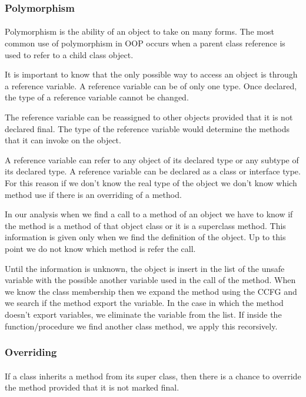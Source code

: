 \documentclass[letterpaper,twocolumn,10pt]{article}
\begin{document}
\subsubsection{Polymorphism} \paragraph{}
Polymorphism is the ability of an object to take on many forms. The most common use of polymorphism in OOP occurs when a parent class reference is used to refer to a child class object.

It is important to know that the only possible way to access an object is through a reference variable. A reference variable can be of only one type. Once declared, the type of a reference variable cannot be changed.

The reference variable can be reassigned to other objects provided that it is not declared final. The type of the reference variable would determine the methods that it can invoke on the object.

A reference variable can refer to any object of its declared type or any subtype of its declared type. A reference variable can be declared as a class or interface type. For this reason if we don't know the real type of the object we don't know which method use if there is an overriding of a method.

In our analysis when we find a call to a method of an object we have to know if the method is a method of that object class or it is a superclass method. This information is given only when we find the definition of the object. Up to this point we do not know which method is refer the call. 

Until the information is unknown, the object is insert in the list of the unsafe variable with the possible another variable used in the call of the method. When we know the class membership then we expand the method using the CCFG and we search if the method export the variable. In the case in which the method doesn't export variables, we eliminate the variable from the list. If inside the function/procedure we find another class method, we apply this recorsively.

\subsubsection{Overriding} \paragraph{}
If a class inherits a method from its super class, then there is a chance to override the method provided that it is not marked final.
\end{document}
